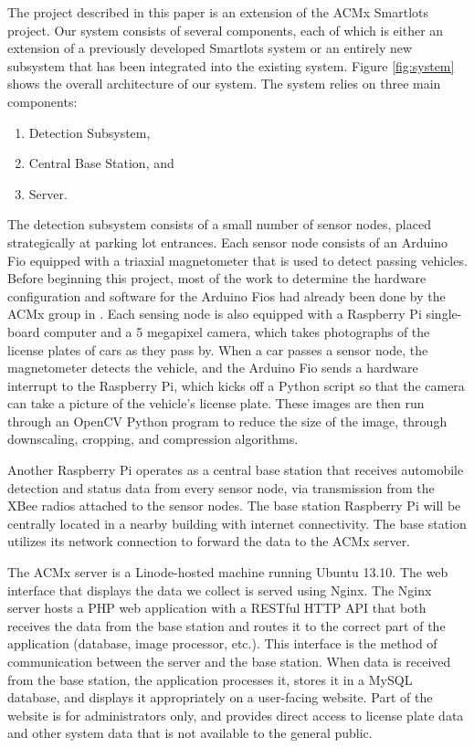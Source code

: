 \documentclass[11pt, oneside, fullpage, doublespace]{article}
\begin{document}
The project described in this paper is an extension of the ACMx Smartlots project. Our system consists of several components, each of which is either an extension of a previously developed Smartlots system or an entirely new subsystem that has been integrated into the existing system. Figure \ref{fig:system} shows the overall architecture of our system. The system relies on three main components:
\begin{enumerate}
\item Detection Subsystem,
\item Central Base Station, and
\item Server.
\end{enumerate}

The detection subsystem consists of a small number of sensor nodes, placed strategically at parking lot entrances. Each sensor node consists of an Arduino Fio equipped with a triaxial magnetometer that is used to detect passing vehicles. Before beginning this project, most of the work to determine the hardware configuration and software for the Arduino Fios had already been done by the ACMx group in \cite{stillwell2013}. Each sensing node is also equipped with a Raspberry Pi single-board computer and a 5 megapixel camera, which takes photographs of the license plates of cars as they pass by. When a car passes a sensor node, the magnetometer detects the vehicle, and the Arduino Fio sends a hardware interrupt to the Raspberry Pi, which kicks off a Python script so that the camera can take a picture of the vehicle's license plate. These images are then run through an OpenCV Python program to reduce the size of the image, through downscaling, cropping, and compression algorithms.

Another Raspberry Pi operates as a central base station that receives automobile detection and status data from every sensor node, via transmission from the XBee radios attached to the sensor nodes. The base station Raspberry Pi will be centrally located in a nearby building with internet connectivity. The base station utilizes its network connection to forward the data to the ACMx server.

The ACMx server is a Linode-hosted machine running Ubuntu 13.10. The web interface that displays the data we collect is served using Nginx. The Nginx server hosts a PHP web application with a RESTful HTTP API that both receives the data from the base station and routes it to the correct part of the application (database, image processor, etc.). This interface is the method of communication between the server and the base station. When data is received from the base station, the application processes it, stores it in a MySQL database, and displays it appropriately on a user-facing website. Part of the website is for administrators only, and provides direct access to license plate data and other system data that is not available to the general public.
\end{document}
